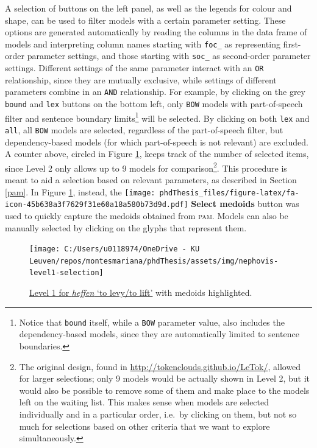 \documentclass[
]{book}
\begin{document}
A selection of buttons on the left panel, as well as the legends for colour and shape, can be used to filter models with a certain parameter setting. These options are generated automatically by reading the columns in the data frame of models and interpreting column names starting with \texttt{foc\_} as representing first-order parameter settings, and those starting with \texttt{soc\_} as second-order parameter settings. Different settings of the same parameter interact with an \texttt{OR} relationship, since they are mutually exclusive, while settings of different parameters combine in an \texttt{AND} relationship. For example, by clicking on the grey \texttt{bound} and \texttt{lex} buttons on the bottom left, only \texttt{BOW} models with part-of-speech filter and sentence boundary limits\footnote{Notice that \texttt{bound} itself, while a \texttt{BOW} parameter value, also includes the dependency-based models, since they are automatically limited to sentence boundaries.} will be selected. By clicking on both \texttt{lex} and \texttt{all}, all \texttt{BOW} models are selected, regardless of the part-of-speech filter, but dependency-based models (for which part-of-speech is not relevant) are excluded. A counter above, circled in Figure \ref{fig:nepho1-selection}, keeps track of the number of selected items, since Level 2 only allows up to 9 models for comparison\footnote{The original design, found in \url{http://tokenclouds.github.io/LeTok/}, allowed for larger selections; only 9 models would be actually shown in Level 2, but it would also be possible to remove some of them and make place to the models left on the waiting list. This makes sense when models are selected individually and in a particular order, i.e.~by clicking on them, but not so much for selections based on other criteria that we want to explore simultaneously.}. This procedure is meant to aid a selection based on relevant parameters, as described in Section \ref{pam}. In Figure \ref{fig:nepho1-selection}, instead, the \texttt{[image: phdThesis\_files/figure-latex/fa-icon-45b638a3f7629f31e60a18a580b73d9d.pdf]} \textbf{Select medoids} button was used to quickly capture the medoids obtained from \textsc{pam}.
Models can also be manually selected by clicking on the glyphs that represent them.



\begin{figure}
\texttt{[image: C:/Users/u0118974/OneDrive - KU Leuven/repos/montesmariana/phdThesis/assets/img/nephovis-level1-selection]} \caption{\href{https://qlvl.github.io/NephoVis/level1.html?type=heffen}{Level 1 for \emph{heffen} `to levy/to lift'} with medoids highlighted.}\label{fig:nepho1-selection}
\end{figure}
\end{document}
